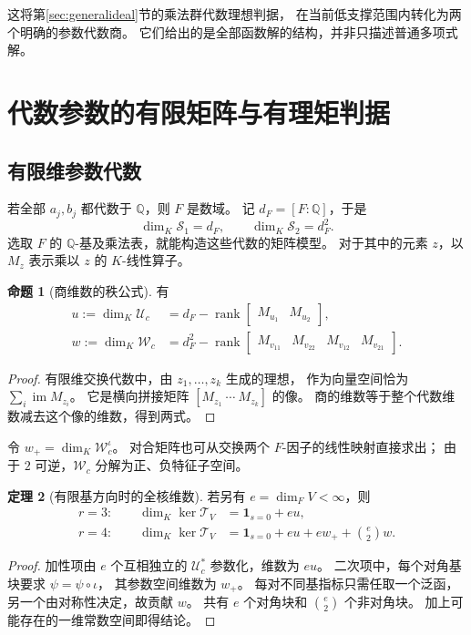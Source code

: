 \documentclass[UTF8,11pt,a4paper]{ctexart}
\theoremstyle{definition}
\newtheorem{theorem}{定理}[section]
\newtheorem{proposition}[theorem]{命题}
\newcommand{\Q}{\mathbb Q}
\newcommand{\im}{\operatorname{im}}
\newcommand{\T}{\mathcal T}
\newcommand{\Uc}{\mathscr U_c}
\newcommand{\Wc}{\mathscr W_c}
\DeclareMathOperator{\rank}{rank}
\numberwithin{equation}{section}
\begin{document}
这将第\ref{sec:generalideal}节的乘法群代数理想判据，
在当前低支撑范围内转化为两个明确的参数代数商。
它们给出的是全部函数解的结构，并非只描述普通多项式解。

\section{代数参数的有限矩阵与有理矩判据}\label{sec:algebraic}
\subsection{有限维参数代数}
若全部 $a_j,b_j$ 都代数于 $\Q$，则 $F$ 是数域。
记 $d_F=[F:\Q]$，于是
\[
 \dim_K\mathscr S_1=d_F,\qquad
 \dim_K\mathscr S_2=d_F^2.
\]
选取 $F$ 的 $\Q$-基及乘法表，就能构造这些代数的矩阵模型。
对于其中的元素 $z$，以 $M_z$ 表示乘以 $z$ 的 $K$-线性算子。

\begin{proposition}[商维数的秩公式]\label{prop:matrixquotient}
有
\[
 \begin{aligned}
 u:=\dim_K\Uc
 &=d_F-\rank\begin{bmatrix}M_{u_1}&M_{u_2}\end{bmatrix},\\
 w:=\dim_K\Wc
 &=d_F^2-\rank
 \begin{bmatrix}M_{v_{11}}&M_{v_{22}}&M_{v_{12}}&M_{v_{21}}\end{bmatrix}.
 \end{aligned}
\]
\end{proposition}
\begin{proof}
有限维交换代数中，由 $z_1,\ldots,z_k$ 生成的理想，
作为向量空间恰为 $\sum_i\im M_{z_i}$。
它是横向拼接矩阵 $[M_{z_1}\ \cdots\ M_{z_k}]$ 的像。
商的维数等于整个代数维数减去这个像的维数，得到两式。
\end{proof}

令 $w_+=\dim_K\Wc^\iota$。
对合矩阵也可从交换两个 $F$-因子的线性映射直接求出；
由于 $2$ 可逆，$\Wc$ 分解为正、负特征子空间。

\begin{theorem}[有限基方向时的全核维数]\label{thm:dimension}
若另有 $e=\dim_FV<\infty$，则
\[
 \begin{aligned}
 r=3:\qquad
 \dim_K\ker\T_V
 &=\mathbf1_{s=0}+eu,\\
 r=4:\qquad
 \dim_K\ker\T_V
 &=\mathbf1_{s=0}+eu+e w_+ +\binom e2w.
 \end{aligned}
\]
\end{theorem}
\begin{proof}
加性项由 $e$ 个互相独立的 $\Uc^*$ 参数化，维数为 $eu$。
二次项中，每个对角基块要求 $\psi=\psi\circ\iota$，
其参数空间维数为 $w_+$。
每对不同基指标只需任取一个泛函，另一个由对称性决定，故贡献 $w$。
共有 $e$ 个对角块和 $\binom e2$ 个非对角块。
加上可能存在的一维常数空间即得结论。
\end{proof}
\end{document}
